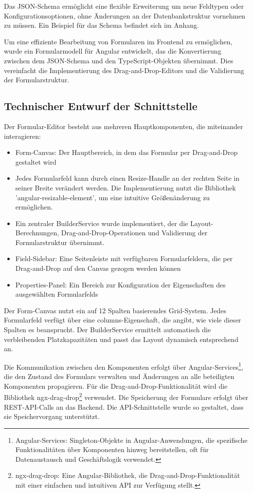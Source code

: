 \documentclass[a4paper,11pt]{article}
\begin{document}
\noindent Das JSON-Schema ermöglicht eine flexible Erweiterung um neue Feldtypen oder Konfigurationsoptionen, ohne Änderungen an der Datenbankstruktur vornehmen zu müssen. Ein Beispiel für das Schema befindet sich im Anhang.

\noindent Um eine effiziente Bearbeitung von Formularen im Frontend zu ermöglichen, wurde ein Formularmodell für Angular entwickelt, das die Konvertierung zwischen dem JSON-Schema und den TypeScript-Objekten übernimmt. Dies vereinfacht die Implementierung des Drag-and-Drop-Editors und die Validierung der Formularstruktur.


\subsection{Technischer Entwurf der Schnittstelle}
Der Formular-Editor besteht aus mehreren Hauptkomponenten, die miteinander interagieren:

\begin{itemize}
  \item Form-Canvas: Der Hauptbereich, in dem das Formular per Drag-and-Drop gestaltet wird
  \item Jedes Formularfeld kann durch einen Resize-Handle an der rechten Seite in seiner Breite verändert werden. Die Implementierung nutzt die Bibliothek 'angular-resizable-element', um eine intuitive Größenänderung zu ermöglichen.
  \item Ein zentraler BuilderService wurde implementiert, der die Layout-Berechnungen, Drag-and-Drop-Operationen und Validierung der Formularstruktur übernimmt.
  \item Field-Sidebar: Eine Seitenleiste mit verfügbaren Formularfeldern, die per Drag-and-Drop auf den Canvas gezogen werden können
  \item Properties-Panel: Ein Bereich zur Konfiguration der Eigenschaften des ausgewählten Formularfelds
\end{itemize}

\noindent Der Form-Canvas nutzt ein auf 12 Spalten basierendes Grid-System. Jedes Formularfeld verfügt über eine columns-Eigenschaft, die angibt, wie viele dieser Spalten es beansprucht. Der BuilderService ermittelt automatisch die verbleibenden Platzkapazitäten und passt das Layout dynamisch entsprechend an.

\noindent Die Kommunikation zwischen den Komponenten erfolgt über Angular-Services\footnote{Angular-Services: Singleton-Objekte in Angular-Anwendungen, die spezifische Funktionalitäten über Komponenten hinweg bereitstellen, oft für Datenaustausch und Geschäftslogik verwendet.}, die den Zustand des Formulars verwalten und Änderungen an alle beteiligten Komponenten propagieren. Für die Drag-and-Drop-Funktionalität wird die Bibliothek ngx-drag-drop\footnote{ngx-drag-drop: Eine Angular-Bibliothek, die Drag-and-Drop-Funktionalität mit einer einfachen und intuitiven API zur Verfügung stellt.} verwendet.
\noindent Die Speicherung der Formulare erfolgt über REST-API-Calls an das Backend. Die API-Schnittstelle wurde so gestaltet, dass sie Speichervorgang unterstützt.
\end{document}
